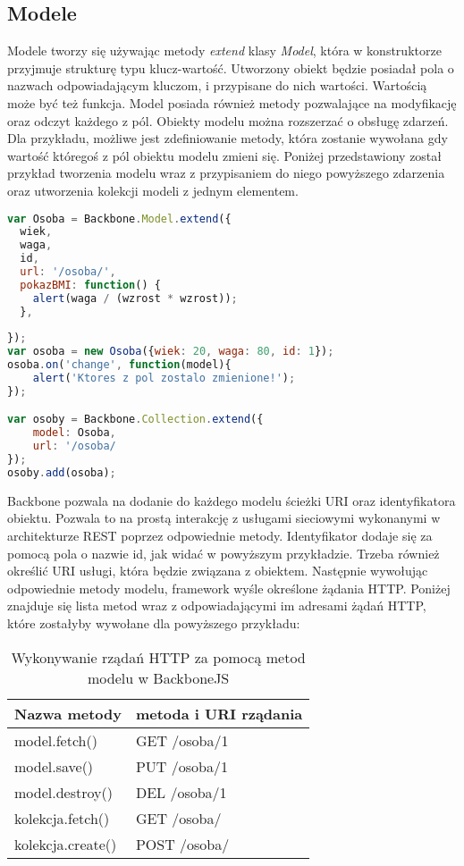 \subsection{Modele}
Modele tworzy się używając metody \textit{extend} klasy \textit{Model}, która w konstruktorze przyjmuje strukturę typu klucz-wartość. Utworzony obiekt będzie posiadał pola o nazwach odpowiadającym kluczom, i przypisane do nich wartości. Wartością może być też funkcja. 
Model posiada również metody pozwalające na modyfikację oraz odczyt każdego z pól. Obiekty modelu można rozszerzać o obsługę zdarzeń. Dla przykładu, możliwe jest zdefiniowanie metody, która zostanie wywołana gdy wartość któregoś z pól obiektu modelu zmieni się. 
Poniżej przedstawiony został przykład tworzenia modelu wraz z przypisaniem do niego powyższego zdarzenia oraz utworzenia kolekcji modeli z jednym elementem.
\begin{lstlisting}[language=JavaScript]
var Osoba = Backbone.Model.extend({
  wiek,
  waga,
  id,
  url: '/osoba/',
  pokazBMI: function() {
  	alert(waga / (wzrost * wzrost));
  },
  
});
var osoba = new Osoba({wiek: 20, waga: 80, id: 1});
osoba.on('change', function(model){
	alert('Ktores z pol zostalo zmienione!');
});

var osoby = Backbone.Collection.extend({
	model: Osoba,
	url: '/osoba/
});
osoby.add(osoba);
\end{lstlisting}

Backbone pozwala na dodanie do każdego modelu ścieżki URI oraz identyfikatora obiektu. Pozwala to na prostą interakcję z usługami sieciowymi wykonanymi w architekturze REST poprzez odpowiednie metody. Identyfikator dodaje się za pomocą pola o nazwie id, jak widać w powyższym przykładzie. Trzeba również określić URI usługi, która będzie związana z obiektem. Następnie wywołując odpowiednie metody modelu, framework wyśle określone żądania HTTP. Poniżej znajduje się lista metod wraz z odpowiadającymi im adresami żądań HTTP, które zostałyby wywołane dla powyższego przykładu:

\begin{table}[h]
	\caption{Wykonywanie rządań HTTP za pomocą metod modelu w BackboneJS}
	\label{tab:heading-styles}
	\begin{tabularx}{\textwidth}{|X|X|}
		\hline
		Nazwa metody 						& metoda i URI rządania 	\\ 
		\hline
		model.fetch()		 				& GET /osoba/1 	\\ 
		\hline
		model.save()						& PUT /osoba/1  \\ 
		\hline
		model.destroy() 					& DEL /osoba/1 \\ 
		\hline
		kolekcja.fetch()					& GET /osoba/  \\ 
		\hline
		kolekcja.create() 					& POST /osoba/ \\ 
		\hline
	\end{tabularx}
\end{table}


